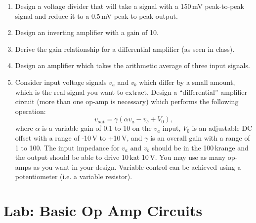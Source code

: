 \documentclass{article}
\begin{document}
\begin{enumerate}
\item Design a voltage divider that will take a signal with a 150\,mV peak-to-peak signal and reduce it to a 0.5\,mV peak-to-peak output.

\item Design an inverting amplifier with a gain of 10. 

\item Derive the gain relationship for a differential amplifier (as seen in class).
 
\item Design an amplifier which takes the arithmetic average of three input signals.

\item \label{ex:differential_amplifier} Consider input voltage signals $v_a$ and $v_b$ which differ by a small amount, which is the real signal you want to extract. Design a ``differential'' amplifier circuit (more than one op-amp is necessary) which performs the following operation:
\begin{equation}
v_{out} = \gamma (\alpha v_a - v_b + V_0),
\end{equation}
where $\alpha$ is a variable gain of 0.1 to 10 on the $v_a$ input, $V_0$ is an adjustable DC offset with a range of -10\,V to +10\,V, and $\gamma$ is an overall gain with a range of 1 to 100. The input impedance for $v_a$ and $v_b$ should be in the 100\,k\Ohm range and the output should be able to drive 10\,k\Ohm at 10\,V. You may use as many op-amps as you want in your design. Variable control can be achieved using a potentiometer (i.e. a variable resistor).
\end{enumerate}

\section{Lab: Basic Op Amp Circuits}
\end{document}
